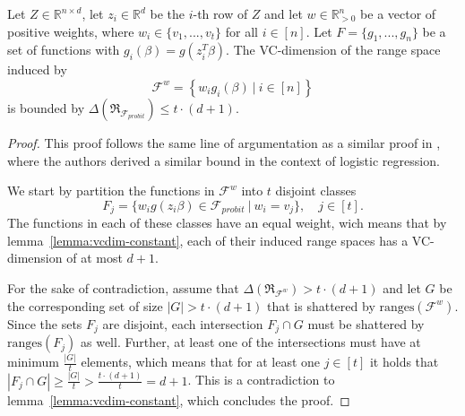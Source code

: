 \begin{lemma}
    Let $Z \in \mathbb{R}^{n \times d}$, let $z_i \in \mathbb{R}^d$ be the
    $i$-th row of $Z$ and let
    $w \in \mathbb{R}^n_{>0}$ be a vector of positive weights,
    where $w_i \in \{ v_1, ..., v_t \}$ for all $i \in [n]$.
    Let $F = \{g_1, ..., g_n\}$ be a set of functions with
    $g_i(\beta) = g(z_i^T \beta)$.
    The VC-dimension of the range space induced by
    \begin{equation*}
        \mathcal{F}^w = \left\{ w_ig_i(\beta) \ |\ i \in [n] \right\}
    \end{equation*}
    is bounded by
    $\Delta(\mathfrak{R}_{\mathcal{F}_{probit}}) \leq t \cdot (d + 1)$.
\end{lemma}
\begin{proof}
    This proof follows the same line of argumentation as a similar proof in
    \cite{on-coresets}, where the authors derived a similar bound
    in the context of logistic regression.

    We start by partition the functions in
    $\mathcal{F}^w$ into $t$ disjoint classes
    \begin{equation*}
        F_j = \{ w_ig(z_i\beta) \in \mathcal{F}_{probit} \
        |\ w_i = v_j \},\quad j \in [t].
    \end{equation*}
    The functions in each of these classes have an equal
    weight, wich means that by lemma~\ref{lemma:vcdim-constant}, each of
    their induced range spaces has a VC-dimension of at most $d+1$.

    For the sake of contradiction, assume that
    $\Delta(\mathfrak{R}_{\mathcal{F}^w}) > t \cdot (d + 1)$ and let
    $G$ be the corresponding set of size $|G| > t \cdot (d + 1)$ that
    is shattered by $\text{ranges}(\mathcal{F}^w)$.
    Since the sets $F_j$ are disjoint, each intersection
    $F_j \cap G$ must be shattered by $\text{ranges}(F_j)$ as well.
    Further, at least one of the intersections must have at minimum
    $\frac{|G|}{t}$ elements, which means that for at least one $j \in [t]$
    it holds that
    $|F_j \cap G| \geq \frac{|G|}{t} > \frac{t \cdot (d+1)}{t} = d + 1$.
    This is a contradiction to lemma~\ref{lemma:vcdim-constant}, which
    concludes the proof.
\end{proof}